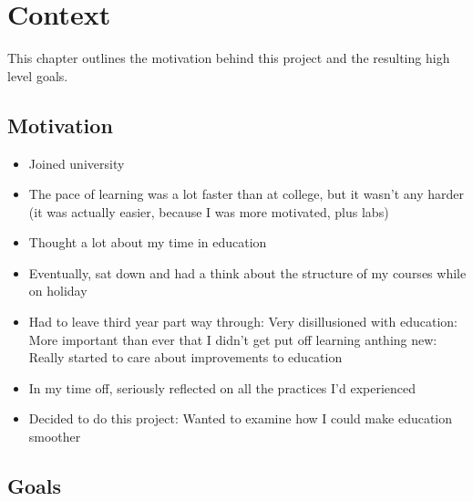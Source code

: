\chapter{Context}
\label{chapter:context}
  This chapter outlines the motivation behind this project and the resulting high level goals.

  \section{Motivation}
    \begin{itemize}
      \item Joined university
      \item The pace of learning was a lot faster than at college, but it wasn't any harder (it was actually easier, because I was more motivated, plus labs)
      \item Thought a lot about my time in education
      \item Eventually, sat down and had a think about the structure of my courses while on holiday
      \item Had to leave third year part way through: Very disillusioned with education: More important than ever that I didn't get put off learning anthing new: Really started to care about improvements to education
      \item In my time off, seriously reflected on all the practices I'd experienced
      \item Decided to do this project: Wanted to examine how I could make education smoother
    \end{itemize}

  \section{Goals}
